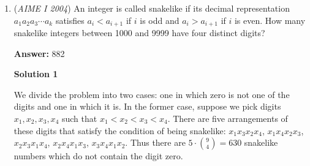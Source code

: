 \begin{enumerate}
 
 \textbf{Answer: }849



\textbf{Solution}

Let $q$ be the number of questions Beta takes on day 1 and $a$ be the number he gets right. Let $b$ be the number he gets right on day 2.

 These inequalities follow:
 \[\frac{a}{q} < \frac{160}{300} = \frac{8}{15}\]
 \[\frac{b}{500-q} < \frac{140}{200} = \frac{7}{10}\]Solving for a and b and adding the two inequalities:
 \[a + b < \frac{8}{15}q + (350 - \frac{7}{10}q)\]
 \[a + b < 350 - \frac{1}{6}q\]From here, we see the largest possible value of $a+b$ is $349$.

 Checking our conditions, we know that $a$ must be positive so therefore $q$ must be positive. A quick check shows that for $2\le q \le 5$, $q$ follows all the conditions and results in $a+b=349$.

 This makes Beta's success ratio $\frac{349}{500}$. Thus, the answer is $m+n = 349 + 500 = \boxed{849}$.

 \textbf{Simple Solution} We see that we want Beta to have more points where there is a higher Alpha success rate (that way, the score is shifted more towards the higher Alpha score). With that in mind, $.7 > 8/15$. Thus, we might as well put as many points as possible into the second day.

 That said, we need Beta to have a positive integer score on either end per requirements. The best way is for Beta to go $\frac{1}{2}$ on the first day. That way, we "waste" the least points- both in the numerator and denominator.

 Thereafter, we see that, letting $x$ be the number of points Beta gained on the second day, $\frac{x}{498} < \frac{7}{10}$; thus $\max(x) = 348$.

 Aha. $348+1+500= \framebox{849}$.

 


	\item (\textit{AIME I 2004}) An integer is called snakelike if its decimal representation $a_1a_2a_3\cdots a_k$ satisfies $a_i<a_{i+1}$ if $i$ is odd and $a_i>a_{i+1}$ if $i$ is even. How many snakelike integers between 1000 and 9999 have four distinct digits?


 
 \textbf{Answer: }882



\textbf{Solution 1}

We divide the problem into two cases: one in which zero is not one of the digits and one in which it is. In the former case, suppose we pick digits $x_1,x_2,x_3,x_4$ such that $x_1<x_2<x_3<x_4$. There are five arrangements of these digits that satisfy the condition of being snakelike: $x_1x_3x_2x_4$, $x_1x_4x_2x_3$, $x_2x_3x_1x_4$, $x_2x_4x_1x_3$, $x_3x_4x_1x_2$. Thus there are $5\cdot {9\choose 4}=630$ snakelike numbers which do not contain the digit zero.


\end{enumerate}
